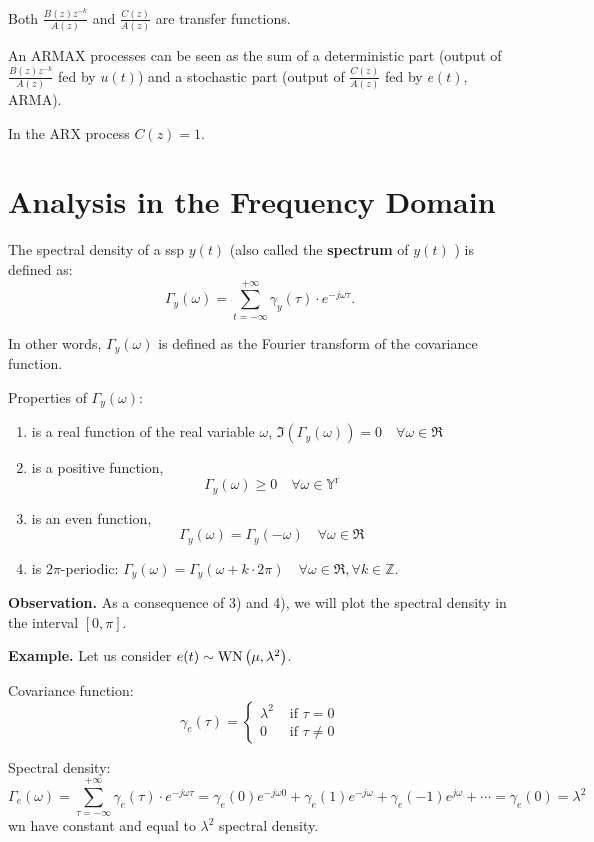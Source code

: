 Both $\frac{B(z) z^{-k}}{A(z)}$ and $\frac{C(z)}{A(z)}$ are transfer functions.

An ARMAX processes can be seen as the sum of a deterministic part (output of $\frac{B(z) z^{-k}}{A(z)}$ fed by $u(t)$) and a stochastic part (output of $\frac{C(z)}{A(z)}$ fed by $e(t)$, ARMA).

In the ARX process $C(z)=1$.

\section{Analysis in the Frequency Domain}
\begin{definition}
	The spectral density of a \gls{ssp} $y(t)$ (also called the \textbf{spectrum} of $y(t)$ ) is defined as:
	\[
		\Gamma_{y}(\omega)=\sum_{t=-\infty}^{+\infty} \gamma_{y}(\tau) \cdot e^{-j \omega \tau}.
	\]
\end{definition}

In other words, $\Gamma_y(\omega)$ is defined as the Fourier transform of the covariance function.

Properties of $\Gamma_{y}(\omega)$:
\begin{enumerate}
	\item is a real function of the real variable $\omega$, $\Im\left(\Gamma_{y}(\omega)\right)=0 \quad \forall \omega \in \Re$
	\item is a positive function,
	$$
		\Gamma_{y}(\omega) \geq 0 \quad \forall \omega \in \mathbb{Y}^{\mathrm{r}}
	$$
	\item is an even function,
	$$
		\Gamma_{y}(\omega)=\Gamma_{y}(-\omega) \quad \forall \omega \in \Re
	$$
	\item is $2\pi$-periodic: $\Gamma_{y}(\omega)=\Gamma_{y}(\omega+k \cdot 2 \pi) \quad \forall \omega \in \Re, \forall k \in \mathbb{Z}$.
\end{enumerate}

\textbf{Observation.}
As a consequence of 3) and 4), we will plot the spectral density in the interval $[0, \pi]$.

\textbf{Example.}
Let us consider $e(t) \sim \operatorname{WN}\left(\mu, \lambda^{2}\right)$. 

Covariance function:
\[
	\gamma_{e}(\tau)= \begin{cases}\lambda^{2} & \text { if } \tau=0 \\ 0 & \text { if } \tau \neq 0\end{cases}
\]


Spectral density:
\[
	\Gamma_{e}(\omega) =\sum_{\tau=-\infty}^{+\infty} \gamma_{e}(\tau) \cdot e^{-j \omega \tau}=\gamma_{e}(0) e^{-j \omega 0}+\gamma_{e}(1) e^{-j \omega}+\gamma_{e}(-1) e^{j \omega}+\cdots=\gamma_{e}(0)=\lambda^{2}
\]
\gls{wn} have constant and equal to $\lambda^{2}$ spectral density.


